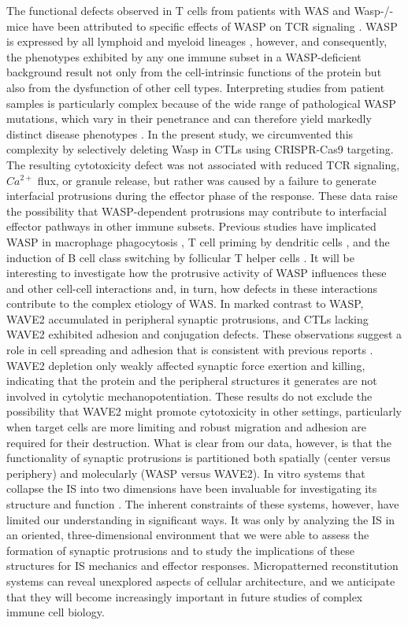 The functional defects observed in T cells from patients with WAS and Wasp-/- mice have been attributed to specific effects of WASP on TCR signaling \cite{Kumari2015, Calvez2011, Cannon2004, Dupre2002, Zhang1999}. WASP is expressed by all lymphoid and myeloid lineages \cite{Rivers2017, Massaad2013}, however, and consequently, the phenotypes exhibited by any one immune subset in a WASP-deficient background result not only from the cell-intrinsic functions of the protein but also from the dysfunction of other cell types. Interpreting studies from patient samples is particularly complex because of the wide range of pathological WASP mutations, which vary in their penetrance and can therefore yield markedly distinct disease phenotypes \cite{Massaad2013}. In the present study, we circumvented this complexity by selectively deleting Wasp in CTLs using CRISPR-Cas9 targeting. The resulting cytotoxicity defect was not associated with reduced TCR signaling, $Ca^{2+}$ flux, or granule release, but rather was caused by a failure to generate interfacial protrusions during the effector phase of the response. These data raise the possibility that WASP-dependent protrusions may contribute to interfacial effector pathways in other immune subsets. Previous studies have implicated WASP in macrophage phagocytosis \cite{Leverrier2001, Lorenzi2000}, T cell priming by dendritic cells \cite{Malinova2016, Bouma2011}, and the induction of B cell class switching by follicular T helper cells \cite{Zhang2016}. It will be interesting to investigate how the protrusive activity of WASP influences these and other cell-cell interactions and, in turn, how defects in these interactions contribute to the complex etiology of WAS. In marked contrast to WASP, WAVE2 accumulated in peripheral synaptic protrusions, and CTLs lacking WAVE2 exhibited adhesion and conjugation defects. These observations suggest a role in cell spreading and adhesion that is consistent with previous reports \cite{Nolz2006, Zipfel2006, Nolz2008}. WAVE2 depletion only weakly affected synaptic force exertion and killing, indicating that the protein and the peripheral structures it generates are not involved in cytolytic mechanopotentiation. These results do not exclude the possibility that WAVE2 might promote cytotoxicity in other settings, particularly when target cells are more limiting and robust migration and adhesion are required for their destruction. What is clear from our data, however, is that the functionality of synaptic protrusions is partitioned both spatially (center versus periphery) and molecularly (WASP versus WAVE2). In vitro systems that collapse the IS into two dimensions have been invaluable for investigating its structure and function \cite{Kupfer2010, Balagopalan2011}. The inherent constraints of these systems, however, have limited our understanding in significant ways. It was only by analyzing the IS in an oriented, three-dimensional environment that we were able to assess the formation of synaptic protrusions and to study the implications of these structures for IS mechanics and effector responses. Micropatterned reconstitution systems can reveal unexplored aspects of cellular architecture, and we anticipate that they will become increasingly important in future studies of complex immune cell biology.

